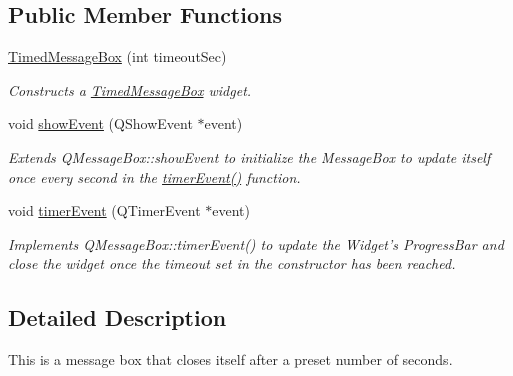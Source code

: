 \subsection*{Public Member Functions}
\begin{DoxyCompactItemize}
\item 
\hyperlink{class_picto_1_1_timed_message_box_a1b5443a5464e977fa7bd82863eef5e8d}{Timed\-Message\-Box} (int timeout\-Sec)
\begin{DoxyCompactList}\small\item\em Constructs a \hyperlink{class_picto_1_1_timed_message_box}{Timed\-Message\-Box} widget. \end{DoxyCompactList}\item 
\hypertarget{class_picto_1_1_timed_message_box_aac4918062d7dad17507df46e8e5e39cc}{void \hyperlink{class_picto_1_1_timed_message_box_aac4918062d7dad17507df46e8e5e39cc}{show\-Event} (Q\-Show\-Event $\ast$event)}\label{class_picto_1_1_timed_message_box_aac4918062d7dad17507df46e8e5e39cc}

\begin{DoxyCompactList}\small\item\em Extends Q\-Message\-Box\-::show\-Event to initialize the Message\-Box to update itself once every second in the \hyperlink{class_picto_1_1_timed_message_box_a88b63a62c261a24d302b0583e794e7d4}{timer\-Event()} function. \end{DoxyCompactList}\item 
\hypertarget{class_picto_1_1_timed_message_box_a88b63a62c261a24d302b0583e794e7d4}{void \hyperlink{class_picto_1_1_timed_message_box_a88b63a62c261a24d302b0583e794e7d4}{timer\-Event} (Q\-Timer\-Event $\ast$event)}\label{class_picto_1_1_timed_message_box_a88b63a62c261a24d302b0583e794e7d4}

\begin{DoxyCompactList}\small\item\em Implements Q\-Message\-Box\-::timer\-Event() to update the Widget's Progress\-Bar and close the widget once the timeout set in the constructor has been reached. \end{DoxyCompactList}\end{DoxyCompactItemize}


\subsection{Detailed Description}
This is a message box that closes itself after a preset number of seconds. 

